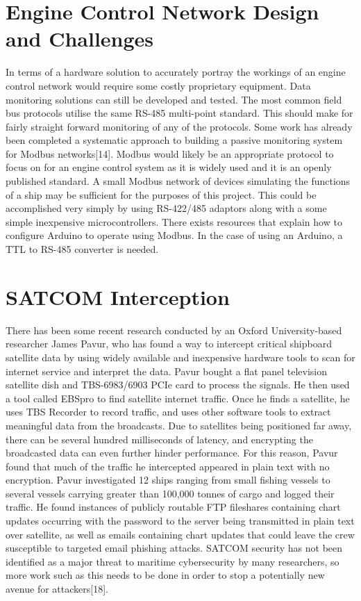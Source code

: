 \documentclass{report}
\begin{document}
\section{Engine Control Network Design and Challenges}

In terms of a hardware solution to accurately portray the workings of an engine control network would require some costly proprietary equipment. Data monitoring solutions can still be developed and tested. The most common field bus protocols utilise the same RS-485 multi-point standard. This should make for fairly straight forward monitoring of any of the protocols. Some work has already been completed a systematic approach to building a passive monitoring system for Modbus networks[14]. Modbus would likely be an appropriate protocol to focus on for an engine control system as it is widely used and it is an  openly published standard. A small Modbus network of devices simulating the functions of a ship may be sufficient for the purposes of this project. This could be accomplished very simply by using RS-422/485 adaptors along with a some simple inexpensive microcontrollers. There exists resources that explain how to configure Arduino to operate using Modbus. In the case of using an Arduino, a TTL to RS-485 converter is needed.



\section{SATCOM Interception}
There has been some recent research conducted by an Oxford University-based researcher James Pavur, who has found a way to intercept critical shipboard satellite data by using widely available and inexpensive hardware tools to scan for internet service and interpret the data. Pavur bought a flat panel television satellite dish and TBS-6983/6903 PCIe card to process the signals. He then used a tool called EBSpro to find satellite internet traffic. Once he finds a satellite, he uses TBS Recorder to record traffic, and uses other software tools to extract meaningful data from the broadcasts. Due to satellites being positioned far away, there can be several hundred milliseconds of latency, and encrypting the broadcasted data can even further hinder performance. For this reason, Pavur found that much of the traffic he intercepted appeared in plain text with no encryption. Pavur investigated 12 ships ranging from small fishing vessels to several vessels carrying greater than 100,000 tonnes of cargo and logged their traffic. He found instances of publicly routable FTP fileshares containing chart updates occurring with the password to the server being transmitted in plain text over satellite, as well as emails containing chart updates that could leave the crew susceptible to targeted email phishing attacks. SATCOM security has not been identified as a major threat to maritime cybersecurity by many researchers, so more work such as this needs to be done in order to stop a potentially new avenue for attackers[18].
\end{document}
